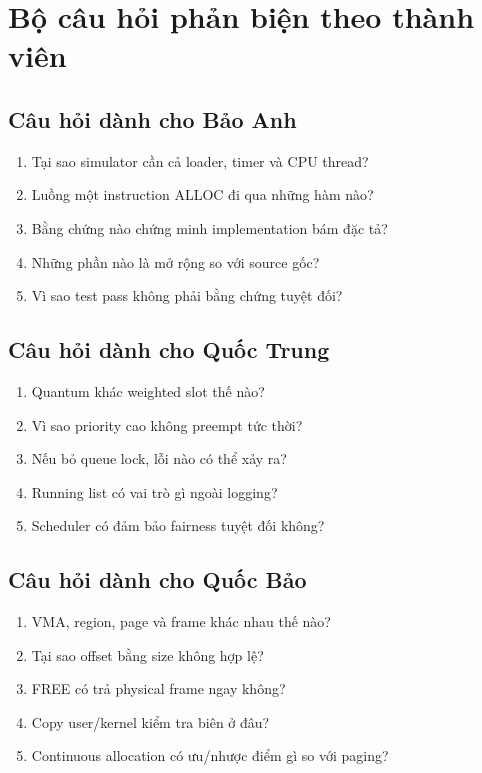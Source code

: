 \documentclass[12pt,a4paper]{article}
\begin{document}
\section{Bộ câu hỏi phản biện theo thành viên}

\subsection{Câu hỏi dành cho Bảo Anh}

\begin{enumerate}
  \item Tại sao simulator cần cả loader, timer và CPU thread?
  \item Luồng một instruction ALLOC đi qua những hàm nào?
  \item Bằng chứng nào chứng minh implementation bám đặc tả?
  \item Những phần nào là mở rộng so với source gốc?
  \item Vì sao test pass không phải bằng chứng tuyệt đối?
\end{enumerate}

\subsection{Câu hỏi dành cho Quốc Trung}

\begin{enumerate}
  \item Quantum khác weighted slot thế nào?
  \item Vì sao priority cao không preempt tức thời?
  \item Nếu bỏ queue lock, lỗi nào có thể xảy ra?
  \item Running list có vai trò gì ngoài logging?
  \item Scheduler có đảm bảo fairness tuyệt đối không?
\end{enumerate}

\subsection{Câu hỏi dành cho Quốc Bảo}

\begin{enumerate}
  \item VMA, region, page và frame khác nhau thế nào?
  \item Tại sao offset bằng size không hợp lệ?
  \item FREE có trả physical frame ngay không?
  \item Copy user/kernel kiểm tra biên ở đâu?
  \item Continuous allocation có ưu/nhược điểm gì so với paging?
\end{enumerate}
\end{document}
